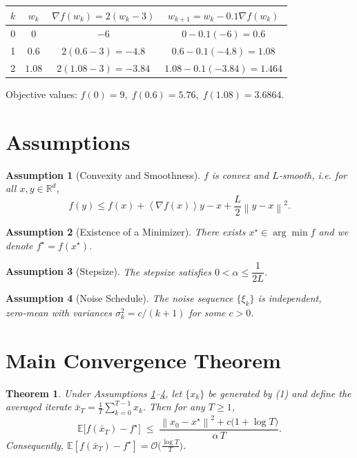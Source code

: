 \documentclass{article}
\newtheorem{theorem}{Theorem}
\newtheorem{assumption}{Assumption}
\newcommand{\E}{\mathbb{E}}
\newcommand{\R}{\mathbb{R}}
\newcommand{\norm}[1]{\left\|#1\right\|}
\newcommand{\inner}[1]{\left\langle#1\right\rangle}
\begin{document}
\begin{center}
\begin{tabular}{c|c|c|c}
$k$ & $w_{k}$ & $\nabla f(w_{k})=2(w_{k}-3)$ & $w_{k+1}=w_{k}-0.1\nabla f(w_{k})$ \\ \hline
0 & $0$ & $-6$ & $0-0.1(-6)=0.6$ \\
1 & $0.6$ & $2(0.6-3)=-4.8$ & $0.6-0.1(-4.8)=1.08$ \\
2 & $1.08$ & $2(1.08-3)=-3.84$ & $1.08-0.1(-3.84)=1.464$ \\
\end{tabular}
\end{center}
Objective values: $f(0)=9,\;f(0.6)=5.76,\;f(1.08)=3.6864$.

\section*{Assumptions}
\begin{assumption}[Convexity and Smoothness]\label{as:convex}
$f$ is convex and $L$‑smooth, i.e. for all $x,y\in\R^{d}$,
\[
f(y)\le f(x)+\inner{\nabla f(x)}{y-x}+\frac{L}{2}\norm{y-x}^{2}.
\tag{4}
\]
\end{assumption}
\begin{assumption}[Existence of a Minimizer]\label{as:min}
There exists $x^{\star}\in\arg\min f$ and we denote $f^{\star}=f(x^{\star})$.
\end{assumption}
\begin{assumption}[Stepsize]\label{as:step}
The stepsize satisfies $0<\alpha\le \dfrac{1}{2L}$.
\end{assumption}
\begin{assumption}[Noise Schedule]\label{as:noise}
The noise sequence $\{\xi_{k}\}$ is independent, zero‑mean with variances
$\sigma_{k}^{2}=c/(k+1)$ for some $c>0$.
\end{assumption}

\section*{Main Convergence Theorem}
\begin{theorem}\label{thm:conv}
Under Assumptions \ref{as:convex}–\ref{as:noise}, let $\{x_{k}\}$ be generated by
(1) and define the averaged iterate
$\displaystyle \bar x_{T}= \frac{1}{T}\sum_{k=0}^{T-1}x_{k}$. Then for any $T\ge1$,
\[
\E\!\bigl[f(\bar x_{T})-f^{\star}\bigr]\;\le\;
\frac{ \norm{x_{0}-x^{\star}}^{2}+c\bigl(1+\log T\bigr)}{\alpha\,T}.
\tag{5}
\]
Consequently, $\E[f(\bar x_{T})-f^{\star}]=\mathcal O\!\bigl(\tfrac{\log T}{T}\bigr)$.
\end{theorem}
\end{document}
